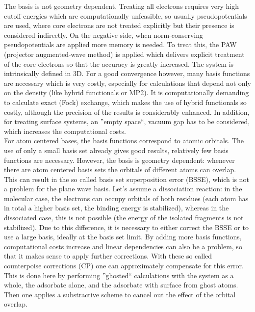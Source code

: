 \documentclass[11pt,DIV=13,BCOR=5mm,a4paper,headinclude]{scrbook}
\renewcommand{\vec}[1]{\underline{#1}}
\begin{document}
The basis is not geometry dependent.
Treating all electrons requires very high cutoff energies  which are computationally unfeasible, so usually pseudopotentials are used, where core electrons are not treated explicitly but their presence is considered indirectly.
On the negative side, when norm-conserving pseudopotentials are applied more memory is needed.
To treat this, the PAW (projector augmented-wave method)\cite{paw1,Kresse1999} is applied which delivers explicit treatment of the core electrons so that the accuracy is greatly increased.
The system is intrinsically defined in 3D.
For a good convergence however, many basis functions are necessary which is very costly, especially for calculations that depend not only on the density (like hybrid functionals or MP2).
It is computationally demanding to calculate exact (Fock) exchange, which makes the use of hybrid functionals so costly, although the precision of the results is considerably enhanced.
In addition, for treating surface systems, an ''empty space``, vacuum gap has to be considered, which increases the computational costs.
\\

For atom centered bases, the basis functions correspond to atomic orbitals.
The use of only a small basis set already gives good results, relatively few basis functions are necessary.
However, the basis is geometry dependent: whenever there are atom centered basis sets the orbitals of different atoms can overlap.
This can result in the so called basis set superposition error (BSSE)\cite{BSSE1970}, which is not a problem for the plane wave basis.
Let's assume a dissociation reaction: in the molecular case, the electrons can occupy orbitals of both residues (each atom has in total a higher basis set, the binding energy is stabilized), whereas in the dissociated case, this is not possible (the energy of the isolated fragments is not stabilized).
Due to this difference, it is necessary to either correct the BSSE or to use a large basis, ideally at the basis set limit.
By adding more basis functions, computational costs increase and linear dependencies can also be a problem, so that it makes sense to apply further corrections.
With these so called counterpoise corrections (CP)\cite{BSSE1970} one can approximately compensate for this error.
This is done here by performing ''ghosted`` calculations with the system as a whole, the adsorbate alone, and the adsorbate with surface from ghost atoms.
Then one applies a substractive scheme to cancel out the effect of the orbital overlap.
\end{document}
